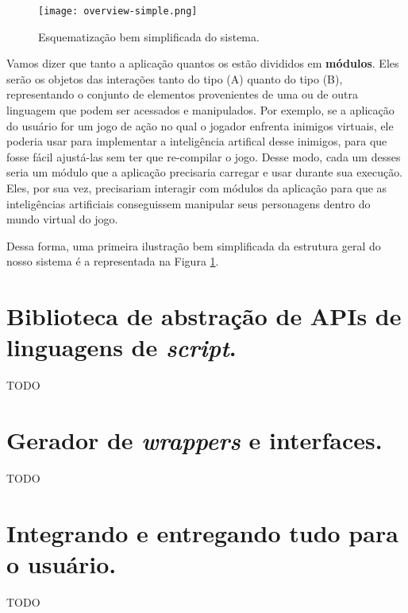     \begin{figure}[ht]
      \centering
      \texttt{[image: overview-simple.png]}
      \caption{Esquematização bem simplificada do sistema.}
      \label{fig:overview-simple}
    \end{figure}

    Vamos dizer que tanto a aplicação quantos os  estão divididos
    em \textbf{módulos}. Eles serão os objetos das interações tanto do tipo (A)
    quanto do tipo (B), representando o conjunto de elementos provenientes de
    uma ou de outra linguagem que podem ser acessados e manipulados. Por
    exemplo, se a aplicação do usuário for um jogo de ação no qual o jogador
    enfrenta inimigos virtuais, ele poderia usar  para implementar a
    inteligência artifical desse inimigos, para que fosse fácil ajustá-las sem
    ter que re-compilar o jogo. Desse modo, cada um desses  seria um
    módulo que a aplicação precisaria carregar e usar durante sua execução.
    Eles, por sua vez, precisariam interagir com módulos da aplicação para que
    as inteligências artificiais conseguissem manipular seus personagens dentro
    do mundo virtual do jogo.

    Dessa forma, uma primeira ilustração bem simplificada da estrutura geral do
    nosso sistema é a representada na Figura \ref{fig:overview-simple}.

  \section{Biblioteca de abstração de APIs de linguagens de \emph{script}.}
  \label{sec:estrutura:opa}
  TODO
  
  \section{Gerador de \emph{wrappers} e interfaces.}
  \label{sec:estrutura:opwig}
  TODO
  
  \section{Integrando e entregando tudo para o usuário.}
  \label{sec:estrutura:integration}
  TODO
